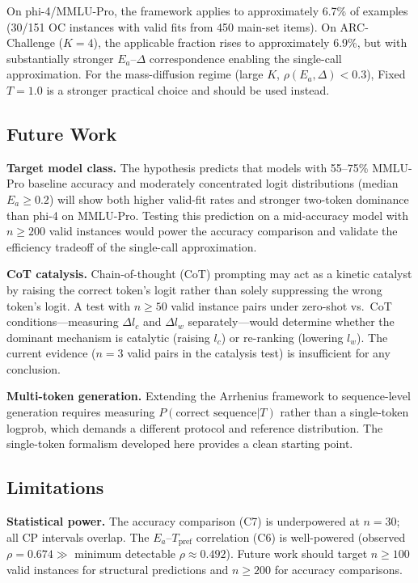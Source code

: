 \documentclass[11pt,letterpaper,twocolumn]{article}
\begin{document}
On phi-4/MMLU-Pro, the framework applies to approximately 6.7\% of examples (30/151 OC
instances with valid fits from 450 main-set items). On ARC-Challenge ($K=4$), the
applicable fraction rises to approximately 6.9\%, but with substantially stronger
$E_a$--$\Delta$ correspondence enabling the single-call approximation. For the mass-diffusion
regime (large $K$, $\rho(E_a, \Delta) < 0.3$), Fixed $T=1.0$ is a stronger practical
choice and should be used instead.

\subsection{Future Work}

\textbf{Target model class.} The hypothesis predicts that models with 55--75\% MMLU-Pro
baseline accuracy and moderately concentrated logit distributions (median $E_a \geq 0.2$)
will show both higher valid-fit rates and stronger two-token dominance than phi-4 on
MMLU-Pro. Testing this prediction on a mid-accuracy model with $n \geq 200$ valid
instances would power the accuracy comparison and validate the efficiency tradeoff of the
single-call approximation.

\textbf{CoT catalysis.} Chain-of-thought (CoT) prompting may act as a kinetic catalyst
by raising the correct token's logit rather than solely suppressing the wrong token's
logit. A test with $n \geq 50$ valid instance pairs under zero-shot vs.\ CoT
conditions---measuring $\Delta l_c$ and $\Delta l_w$ separately---would determine whether
the dominant mechanism is catalytic (raising $l_c$) or re-ranking (lowering $l_w$). The
current evidence ($n=3$ valid pairs in the catalysis test) is insufficient for any
conclusion.

\textbf{Multi-token generation.} Extending the Arrhenius framework to sequence-level
generation requires measuring $P(\text{correct sequence}|T)$ rather than a single-token
logprob, which demands a different protocol and reference distribution. The single-token
formalism developed here provides a clean starting point.

\subsection{Limitations}

\textbf{Statistical power.} The accuracy comparison (C7) is underpowered at $n=30$; all
CP intervals overlap. The $E_a$--$T_\text{pref}$ correlation (C6) is well-powered
(observed $\rho = 0.674 \gg$ minimum detectable $\rho \approx 0.492$). Future work
should target $n \geq 100$ valid instances for structural predictions and $n \geq 200$
for accuracy comparisons.
\end{document}
